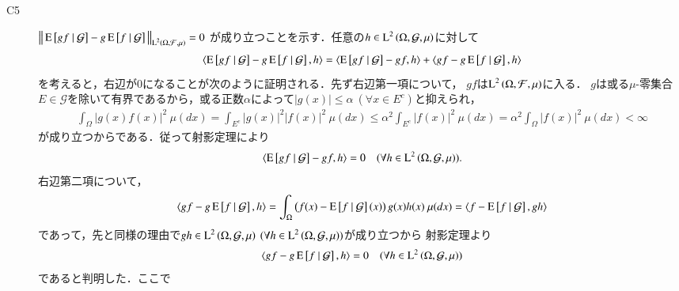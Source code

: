 \begin{prf}
\begin{description}
			\item[C5] $\left\|\, \operatorname{E} \left[ gf \ \middle|\ \mathcal{G} \right] - g\operatorname{E} \left[ f \ \middle|\ \mathcal{G} \right]\, \right\|_{\operatorname{L}^{2} \left(\Omega, \mathcal{F},\mu\right)} = 0$
				が成り立つことを示す．任意の$h \in \operatorname{L}^{2} \left(\Omega, \mathcal{G},\mu\right)$に対して
				\begin{align}
					\inprod<\cexp{gf}{\mathcal{G}} - g\cexp{f}{\mathcal{G}}, h> 
					= \inprod<\cexp{gf}{\mathcal{G}} - gf, h> + \inprod<gf - g\cexp{f}{\mathcal{G}}, h>
				\end{align}
				を考えると，右辺が0になることが次のように証明される．先ず右辺第一項について，
				$gf$は$\operatorname{L}^{2} \left(\Omega, \mathcal{F},\mu\right)$に入る．
				$g$は或る$\mu$-零集合$E \in \mathcal{G}$を除いて有界であるから，或る正数$\alpha$によって$|g(x)| \leq \alpha \ (\forall x \in E^c)$と抑えられ，
				\begin{align}
					\int_{\Omega} |g(x)f(x)|^2\ \mu(dx) = \int_{E^c} |g(x)|^2|f(x)|^2\ \mu(dx) \leq \alpha^2 \int_{E^c} |f(x)|^2\ \mu(dx) = \alpha^2 \int_{\Omega} |f(x)|^2\ \mu(dx) < \infty
				\end{align}
				が成り立つからである．従って射影定理により
				\begin{align}
					\inprod<\cexp{gf}{\mathcal{G}} - gf, h> = 0 \quad (\forall h \in \Lp{2}{\Omega, \mathcal{G},\mu}).
				\end{align}
				右辺第二項について，
				\begin{align}
					\inprod<gf - g\cexp{f}{\mathcal{G}}, h> = \int_{\Omega} \left( f(x) - \cexp{f}{\mathcal{G}}(x) \right) g(x)h(x)\ \mu(dx)
					= \inprod<f - \cexp{f}{\mathcal{G}}, gh>
				\end{align}
				であって，先と同様の理由で$gh \in \operatorname{L}^{2} \left(\Omega, \mathcal{G},\mu\right) \ (\forall h \in \operatorname{L}^{2} \left(\Omega, \mathcal{G},\mu\right))$が成り立つから
				射影定理より
				\begin{align}
					\inprod<gf - g\cexp{f}{\mathcal{G}}, h> = 0  \quad (\forall h \in \Lp{2}{\Omega, \mathcal{G},\mu})
				\end{align}
				であると判明した．ここで
		\end{description}
	\end{prf}